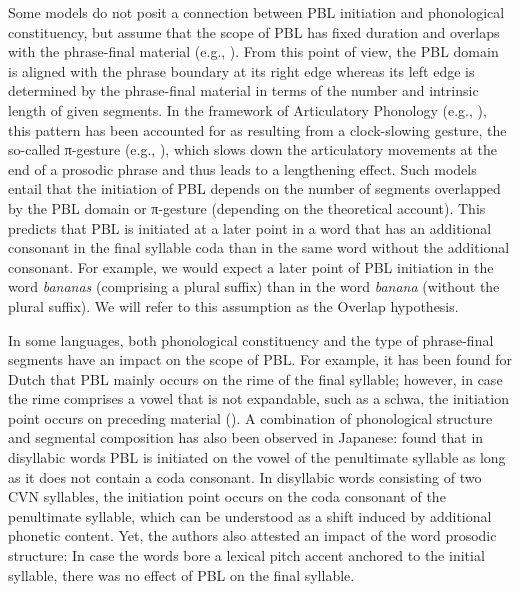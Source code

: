 \documentclass[output=paper]{langscibook}
\begin{document}
Some models do not posit a connection between PBL initiation and phonological constituency, but assume that the scope of PBL has fixed duration and overlaps with the phrase-final material (e.g., \citealt{ByrdSaltzman2003, ByrdEtal2005, ByrdEtal2006}). From this point of view, the PBL domain is aligned with the phrase boundary at its right edge whereas its left edge is determined by the phrase-final material in terms of the number and intrinsic length of given segments. In the framework of Articulatory Phonology (e.g., \citealt{BrowmanGoldstein1992, GoldsteinEtal2006}), this pattern has been accounted for as resulting from a clock-slowing gesture, the so-called π-gesture (e.g., \citealt{ByrdSaltzman2003, ByrdEtal2005, ByrdEtal2006}), which slows down the articulatory movements at the end of a prosodic phrase and thus leads to a lengthening effect. Such models entail that the initiation of PBL depends on the number of segments overlapped by the PBL domain or π-gesture (depending on the theoretical account). This predicts that PBL is initiated at a later point in a word that has an additional consonant in the final syllable coda than in the same word without the additional consonant. For example, we would expect a later point of PBL initiation in the word \textit{bananas} (comprising a plural suffix) than in the word \textit{banana} (without the plural suffix). We will refer to this assumption as the Overlap hypothesis.

In some languages, both phonological constituency and the type of phrase-final segments have an impact on the scope of PBL. For example, it has been found for Dutch that PBL mainly occurs on the rime of the final syllable; however, in case the rime comprises a vowel that is not expandable, such as a schwa, the initiation point occurs on preceding material (\citealt{Cambier-Langeveld1997}). A combination of phonological structure and segmental composition has also been observed in Japanese: \citet{SeoEtal2019} found that in disyllabic words PBL is initiated on the vowel of the penultimate syllable as long as it does not contain a coda consonant. In disyllabic words consisting of two CVN syllables, the initiation point occurs on the coda consonant of the penultimate syllable, which can be understood as a shift induced by additional phonetic content. Yet, the authors also attested an impact of the word prosodic structure: In case the words bore a lexical pitch accent anchored to the initial syllable, there was no effect of PBL on the final syllable.
\end{document}
